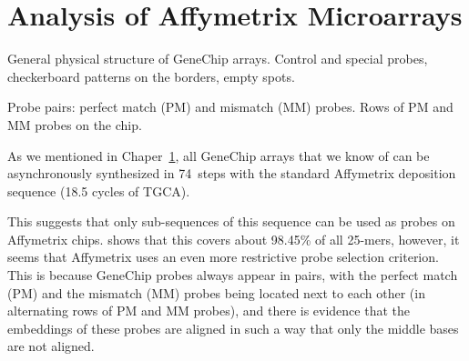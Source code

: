 \chapter{Analysis of Affymetrix Microarrays}
\label{ch:affy}


General physical structure of GeneChip arrays. Control and special probes,
checkerboard patterns on the borders, empty spots.

Probe pairs: perfect match (PM) and mismatch (MM) probes. Rows of PM and MM
probes on the chip.

As we mentioned in Chaper~\ref{ch:affy}, all GeneChip arrays that we know of can be
asynchronously synthesized in 74~steps with the standard Affymetrix deposition sequence
(18.5 cycles of TGCA).

This suggests that only sub-sequences of this sequence
can be used as probes on Affymetrix chips.
\citet{Rahmann2006SubsequenceCombinatorics} shows that this
covers about 98.45\% of all 25-mers, however, it seems that Affymetrix uses
an even more restrictive probe selection criterion. This is because 
GeneChip probes
always appear in pairs, with the perfect match (PM) and the mismatch (MM) probes being located
next to each other (in alternating rows of PM and MM probes),
and there is evidence that the embeddings of these probes are aligned in such a way
that only the middle bases are not aligned.
